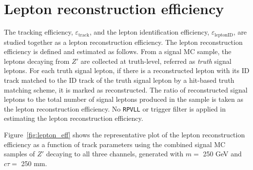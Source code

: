 \section{Lepton reconstruction efficiency}
\label{sec:tracking_efficiency}
The tracking efficiency, $\varepsilon_{\mathrm{track}}$, and the lepton identification efficiency, $\varepsilon_{\mathrm{leptonID}}$, are studied together as a lepton reconstruction efficiency. The lepton reconstruction efficiency is defined and estimated as follows. From a signal MC sample, the leptons decaying from $Z'$ are collected at truth-level, referred as \textit{truth} signal leptons. For each truth signal lepton, if there is a reconstructed lepton with its ID track matched to the ID track of the truth signal lepton by a hit-based truth matching scheme, it is marked as reconstructed. The ratio of reconstructed signal leptons to the total number of signal leptons produced in the sample is taken as the lepton reconstruction efficiency. No \texttt{RPVLL} or trigger filter is applied in estimating the lepton reconstruction efficiency.

Figure~\ref{fig:lepton_eff} shows the representative plot of the lepton reconstruction efficiency as a function of track parameters using the combined signal MC samples of $Z'$ decaying to all three channels, generated with $m = $ 250 GeV and $c\tau=$ 250 mm.


